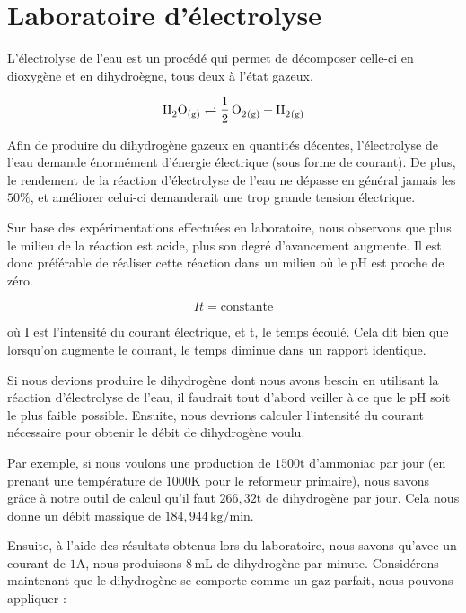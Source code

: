 \documentclass[a4paper, oneside, 12pt]{article}
\begin{document}
\section{Laboratoire d’électrolyse}

L'électrolyse de l'eau est un procédé qui permet de décomposer celle-ci en dioxygène 
et en dihydroègne, tous deux à l'état gazeux.

\begin{equation*}
	\ce{H2O_{(g)} \rightleftharpoons \frac{1}{2} \, O2_{(g)} + H2_{(g)}} 
\end{equation*}

Afin de produire du dihydrogène gazeux en quantités décentes, l'électrolyse de l'eau 
demande énormément d'énergie électrique (sous forme de courant). De plus, le rendement
de la réaction d'électrolyse de l'eau ne dépasse en général jamais les $50\%$, 
et améliorer celui-ci demanderait une trop grande tension électrique.

Sur base des expérimentations effectuées en laboratoire, nous observons que plus 
le milieu de la réaction est acide, plus son degré d'avancement augmente. Il est donc
préférable de réaliser cette réaction dans un milieu où le pH est proche de zéro.


\begin{equation*}
	It = \text{constante}
\end{equation*}

où I est l'intensité du courant électrique, et t, le temps écoulé.
Cela dit bien que lorsqu'on augmente le courant, le temps diminue dans un rapport identique.

Si nous devions produire le dihydrogène dont nous avons besoin en utilisant la 
réaction d'électrolyse de l'eau, il faudrait tout d'abord veiller à ce que le pH soit le
plus faible possible. Ensuite, nous devrions calculer l'intensité du courant nécessaire
pour obtenir le débit de dihydrogène voulu.

Par exemple, si nous voulons une production de $1500 \si{\tonne}$ d'ammoniac par 
jour (en prenant une température de $1000 \si{\kelvin}$ pour le reformeur primaire),
nous savons grâce à notre outil de calcul qu'il faut $266,32 \si{\tonne}$ de dihydrogène
par jour. Cela nous donne un débit massique de $184,944 \, \si{\kilo\gram/\minute}$.

Ensuite, à l'aide des résultats obtenus lors du laboratoire, nous savons qu'avec 
un courant de $1 \si{\ampere}$, nous produisons $8 \, \si{\milli\liter}$ de dihydrogène
par minute. Considérons maintenant que le dihydrogène se comporte comme un gaz parfait,
nous pouvons appliquer :
\end{document}

